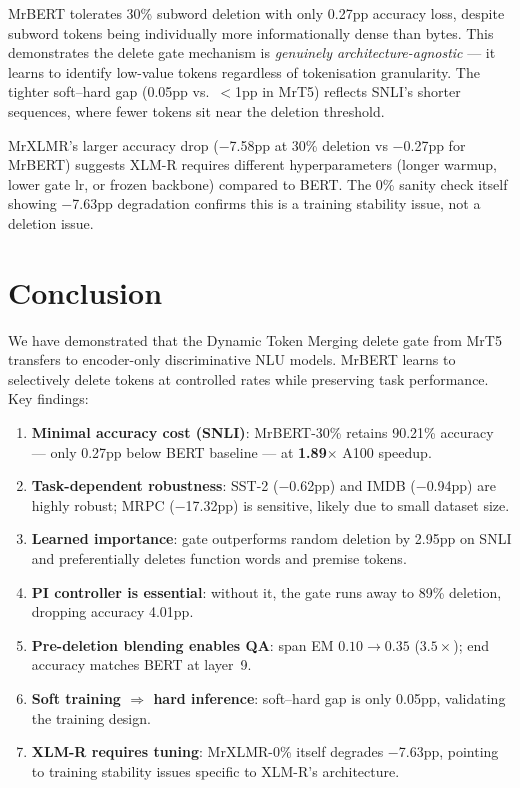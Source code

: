 \documentclass[11pt,a4paper]{article}
\begin{document}
MrBERT tolerates 30\% subword deletion with only 0.27pp accuracy loss, despite subword tokens being individually more informationally dense than bytes. This demonstrates the delete gate mechanism is \emph{genuinely architecture-agnostic} --- it learns to identify low-value tokens regardless of tokenisation granularity. The tighter soft--hard gap (0.05pp vs.\ $<$1pp in MrT5) reflects SNLI's shorter sequences, where fewer tokens sit near the deletion threshold.

MrXLMR's larger accuracy drop ($-$7.58pp at 30\% deletion vs $-$0.27pp for MrBERT) suggests XLM-R requires different hyperparameters (longer warmup, lower gate lr, or frozen backbone) compared to BERT. The 0\% sanity check itself showing $-$7.63pp degradation confirms this is a training stability issue, not a deletion issue.


\section{Conclusion}
\label{sec:conclusion}

We have demonstrated that the Dynamic Token Merging delete gate from MrT5 transfers to encoder-only discriminative NLU models. MrBERT learns to selectively delete tokens at controlled rates while preserving task performance. Key findings:

\begin{enumerate}[nosep]
    \item \textbf{Minimal accuracy cost (SNLI)}: MrBERT-30\% retains 90.21\% accuracy --- only 0.27pp below BERT baseline --- at \textbf{1.89$\times$} A100 speedup.
    \item \textbf{Task-dependent robustness}: SST-2 ($-$0.62pp) and IMDB ($-$0.94pp) are highly robust; MRPC ($-$17.32pp) is sensitive, likely due to small dataset size.
    \item \textbf{Learned importance}: gate outperforms random deletion by 2.95pp on SNLI and preferentially deletes function words and premise tokens.
    \item \textbf{PI controller is essential}: without it, the gate runs away to 89\% deletion, dropping accuracy 4.01pp.
    \item \textbf{Pre-deletion blending enables QA}: span EM $0.10\to0.35$ ($3.5\times$); end accuracy matches BERT at layer~9.
    \item \textbf{Soft training $\Rightarrow$ hard inference}: soft--hard gap is only 0.05pp, validating the training design.
    \item \textbf{XLM-R requires tuning}: MrXLMR-0\% itself degrades $-$7.63pp, pointing to training stability issues specific to XLM-R's architecture.
\end{enumerate}
\end{document}
